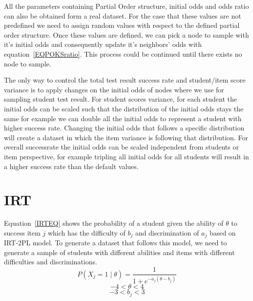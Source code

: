All the parameters containing Partial Order structure, initial odds and odds ratio can also be obtained form a real dataset. For the case that these values are not predefined we need to assign random values with respect to the defined partial order structure. Once these values are defined, we can pick a node to sample with it's initial odds and consequently update it's neighbors' odds with equation~\ref{EQPOKSratio}. This process could be continued until there exists no node to sample.


The only way to control the total test result success rate and student/item score variance is to apply changes on the initial odds of nodes where we use for sampling student test result. For student scores variance, for each student the initial odds can be scaled such that the distribution of the initial odds stays the same for example we can double all the initial odds to represent a student with higher success rate. Changing the initial odds that follows a specific distribution will create a dataset in which the item variance is following that distribution. For overall successrate the initial odds can be scaled independent from students or item perspective, for example tripling all initial odds for all students will result in a higher success rate than the default values.

\section{IRT}

Equation~\ref{IRTEQ} shows the probability of a student given the ability of $\theta$ to success item $j$ which has the difficulty of $b_j$ and discrimination of $a_j$ based on IRT-2PL model. To generate a dataset that follows this model, we need to generate a sample of students with different abilities and items with different difficulties and discriminations. 
\begin{equation}
P(X_j\!=\!1\;|\;\theta) = \frac{1}{1+e^{-a_j(\theta-b_j)}}
\label{IRTEQ}
\end{equation}
\[-4 < \theta < 4\]
\[-3 < b_j < 3\]

